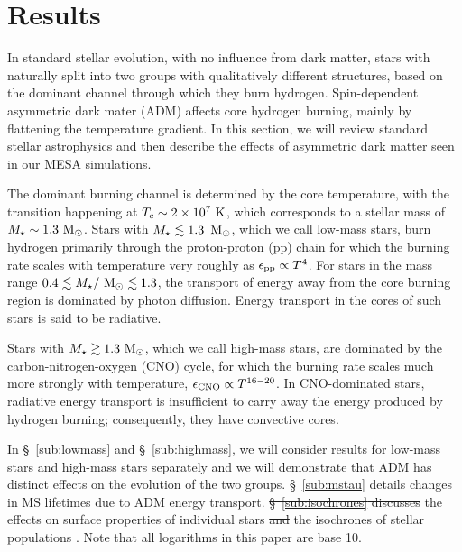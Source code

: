 \documentclass[useAMS,usenatbib]{mnras}
\providecommand{\DIFadd}[1]{{\protect\color{blue}\uwave{#1}}} %
\providecommand{\DIFdel}[1]{{\protect\color{red}\sout{#1}}}                      %
\providecommand{\DIFaddbegin}{} %
\providecommand{\DIFaddend}{} %
\providecommand{\DIFdelbegin}{} %
\providecommand{\DIFdelend}{} %
\newcommand{\DIFscaledelfig}{0.5}
\newlength{\DIFdelgraphicswidth} %
\newlength{\DIFdelgraphicsheight} %
\newcommand{\DIFaddincludegraphics}[2][]{{\color{blue}\fbox{\DIFOincludegraphics[#1]{#2}}}} %
\newcommand{\DIFdelincludegraphics}[2][]{%
\sbox{\DIFdelgraphicsbox}{\DIFOincludegraphics[#1]{#2}}%
\settoboxwidth{\DIFdelgraphicswidth}{\DIFdelgraphicsbox} %
\settoboxtotalheight{\DIFdelgraphicsheight}{\DIFdelgraphicsbox} %
\scalebox{\DIFscaledelfig}{%
\parbox[b]{\DIFdelgraphicswidth}{\usebox{\DIFdelgraphicsbox}\\[-\baselineskip] \rule{\DIFdelgraphicswidth}{0em}}\llap{\resizebox{\DIFdelgraphicswidth}{\DIFdelgraphicsheight}{%
\setlength{\unitlength}{\DIFdelgraphicswidth}%
\begin{picture}(1,1)%
\thicklines\linethickness{2pt} %
{\color[rgb]{1,0,0}\put(0,0){\framebox(1,1){}}}%
{\color[rgb]{1,0,0}\put(0,0){\line( 1,1){1}}}%
{\color[rgb]{1,0,0}\put(0,1){\line(1,-1){1}}}%
\end{picture}%
}\hspace*{3pt}}} %
} %
\DeclareRobustCommand{\DIFaddbegin}{\DIFOaddbegin \let\includegraphics\DIFaddincludegraphics} %
\DeclareRobustCommand{\DIFaddend}{\DIFOaddend \let\includegraphics\DIFOincludegraphics} %
\DeclareRobustCommand{\DIFdelbegin}{\DIFOdelbegin \let\includegraphics\DIFdelincludegraphics} %
\DeclareRobustCommand{\DIFdelend}{\DIFOaddend \let\includegraphics\DIFOincludegraphics} %
\begin{document}
\section{Results}
\label{sec:results}

In standard stellar evolution, with no influence from dark matter, stars with \mrange naturally split into two groups with qualitatively different structures, based on the dominant channel through which they burn hydrogen. Spin-dependent asymmetric dark mater (ADM) affects core hydrogen burning, mainly by flattening the temperature gradient. In this section, we will review standard stellar astrophysics \citep{Kippenhahn2012} and then describe the effects of asymmetric dark matter seen in our MESA simulations.

The dominant burning channel is determined by the core temperature, 
with the transition happening at $T_\mathrm{c} \sim 2 \times 10^7 \ \mathrm{K}$, 
which corresponds to a stellar mass of $M_{\star} \sim1.3 \ \mathrm{M}_{\odot}$.
Stars with $M_{\star} \lesssim 1.3 \, \ \mathrm{M}_{\odot}$, which we call low-mass stars, 
burn hydrogen primarily through the proton-proton (pp) chain 
for which the burning rate scales with temperature very roughly as $\epsilon_{\mathrm{pp}} \propto T^4$. 
For stars in the mass range $0.4 \lesssim M_{\star}/\ \mathrm{M}_{\odot} \lesssim 1.3$, 
the transport of energy away from the core burning region is dominated 
by photon diffusion. Energy transport in the cores of such stars is said 
to be radiative.

Stars with $M_{\star} \gtrsim 1.3 \ \mathrm{M}_{\odot}$, 
which we call high-mass stars, 
are dominated by the carbon-nitrogen-oxygen (CNO) cycle, 
for which the burning rate scales much more strongly with temperature, 
$\epsilon_{\mathrm{CNO}} \propto T^{16-20}$. In CNO-dominated stars, 
radiative energy transport is insufficient 
to carry away the energy produced by hydrogen burning; consequently, they have convective cores.


In \S~\ref{sub:lowmass} and \S~\ref{sub:highmass}, we will consider results for low-mass stars and high-mass stars separately and we will demonstrate that ADM has distinct effects on the evolution of the two groups. \S~\ref{sub:mstau} details changes in MS lifetimes due to ADM energy transport. \DIFdelbegin \DIFdel{\S~\ref{sub:isochrones} discusses }\DIFdelend \DIFaddbegin \DIFadd{We discuss }\DIFaddend the effects on surface properties of individual stars \DIFdelbegin \DIFdel{and }\DIFdelend \DIFaddbegin \DIFadd{in \S~\ref{sub:tracks}, and on }\DIFaddend the isochrones of stellar populations \DIFaddbegin \DIFadd{in \S~\ref{sub:isochrones}}\DIFaddend .
Note that all logarithms in this paper are base 10.
\end{document}
